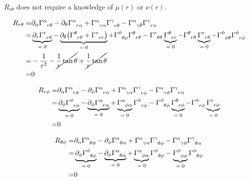 \documentclass[]{article}
\begin{document}
 $R_{r\theta}$ does not require a knowledge of $\mu(r)$ or $\nu(r)$.
 
\begin{align*}
	R_{r\theta} =& \partial_\alpha \Gamma\indices{^\alpha_{r\theta}} - \partial_\theta \Gamma\indices{^\alpha_{r\alpha}} + \Gamma\indices{^\alpha_{\gamma\alpha}} \Gamma\indices{^\gamma_{r\theta}} - \Gamma\indices{^\alpha_{\gamma\theta}} \Gamma\indices{^\gamma_{r\alpha}}\\
	=& \underbrace{\partial_r \Gamma\indices{^r_{r\theta}}}_\text{$=0$} - \underbrace{\partial_\theta \big(\Gamma\indices{^\theta_{r\theta}}+\Gamma\indices{^r_{rr}}\big)}_\text{$=0$} + \Gamma\indices{^\phi_{\theta\phi}} \Gamma\indices{^\theta_{r\theta}} - \Gamma\indices{^r_{\theta\theta}} \underbrace{\Gamma\indices{^\theta_{rr}}}_\text{$=0$} - \Gamma\indices{^\theta_{r\theta}} \underbrace{\Gamma\indices{^r_{r\theta}}}_\text{$=0$}- \Gamma\indices{^\phi_{\phi\theta}} \Gamma\indices{^\phi_{r\phi}}\\
	=&-\frac{1}{r^2} -\cancel{\frac{1}{r}\tan \theta} + \cancel{\frac{1}{r}\tan \theta}\\
	=& 0
\end{align*}

\begin{align*}
	R_{r\phi} =& \partial_\alpha \Gamma\indices{^\alpha_{r\phi}} - \partial_\phi \Gamma\indices{^\alpha_{r\alpha}} + \Gamma\indices{^\alpha_{\gamma\alpha}} \Gamma\indices{^\gamma_{r\phi}} - \Gamma\indices{^\alpha_{\gamma\phi}} \Gamma\indices{^\gamma_{r\alpha}}\\
	=& \underbrace{\partial_\phi \Gamma\indices{^\phi_{r\phi}}}_\text{$=0$} - \underbrace{\partial_\phi \Gamma\indices{^\alpha_{r\alpha}}}_\text{$=0$} + \underbrace{\Gamma\indices{^\alpha_{\phi\alpha}}}_\text{$=0$} \Gamma\indices{^\phi_{r\phi}} - \Gamma\indices{^\phi_{\theta\phi}} \underbrace{\Gamma\indices{^\theta_{r\phi}}}_\text{$=0$} - \Gamma\indices{^\phi_{r\phi}} \underbrace{\Gamma\indices{^r_{r\phi}}}_\text{$=0$}\\
	=&0
\end{align*}

\begin{align*}
	R_{\theta\phi} =& \partial_\alpha \Gamma\indices{^\alpha_{\theta\phi}} - \partial_\phi \Gamma\indices{^\alpha_{\theta\alpha}} + \Gamma\indices{^\alpha_{\gamma\alpha}} \Gamma\indices{^\gamma_{\theta\phi}} - \Gamma\indices{^\alpha_{\gamma\phi}} \Gamma\indices{^\gamma_{\theta\alpha}}\\
	=& \underbrace{\partial_\phi \Gamma\indices{^\phi_{\theta\phi}}}_\text{$=0$} - \underbrace{\partial_\phi \Gamma\indices{^\alpha_{\theta\alpha}}}_\text{$=0$} + \underbrace{\Gamma\indices{^\alpha_{\phi\alpha}}}_\text{$=0$} \Gamma\indices{^\phi_{\theta\phi}} - \underbrace{\Gamma\indices{^\phi_{\phi\phi}}}_\text{$=0$} \Gamma\indices{^\phi_{\theta\phi}}\\
	=&0
\end{align*}
\end{document}
